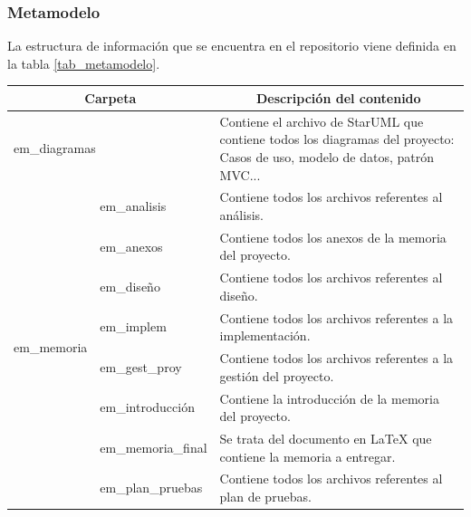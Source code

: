 \subsubsection{Metamodelo}
La estructura de información que se encuentra en el repositorio viene definida en la tabla \ref{tab_metamodelo}.

\begin{table}[htpb]
\centering
\begin{tabularx}{\textwidth}{|l|l|X|}
\hline
\multicolumn{2}{|c|}{\textbf{Carpeta}}                     & \multicolumn{1}{c|}{\textbf{Descripción del contenido}}                                                                             \\ \hline
\multicolumn{2}{|X|}{em\_diagramas}               & Contiene el archivo de StarUML que contiene todos los diagramas del proyecto: Casos de uso, modelo de datos, patrón MVC... \\ \hline
\multirow{8}{*}{em\_memoria} & em\_analisis       & Contiene todos los archivos referentes al análisis.                                                                        \\ \cline{2-3} 
                             & em\_anexos         & Contiene todos los anexos de la memoria del proyecto.                                                                      \\ \cline{2-3} 
                             & em\_diseño         & Contiene todos los archivos referentes al diseño.                                                                          \\ \cline{2-3} 
                             & em\_implem         & Contiene todos los archivos referentes a la implementación.                                                                          \\ \cline{2-3} 
                             & em\_gest\_proy     & Contiene todos los archivos referentes a la gestión del proyecto.                                                          \\ \cline{2-3} 
                             & em\_introducción   & Contiene la introducción de la memoria del proyecto.                                                                       \\ \cline{2-3} 
                             & em\_memoria\_final & Se trata del documento en LaTeX que contiene la memoria a entregar.                                                        \\ \cline{2-3} 
                             & em\_plan\_pruebas  & Contiene todos los archivos referentes al plan de pruebas.                                                                 \\ \hline

\end{tabularx}
\end{table}
